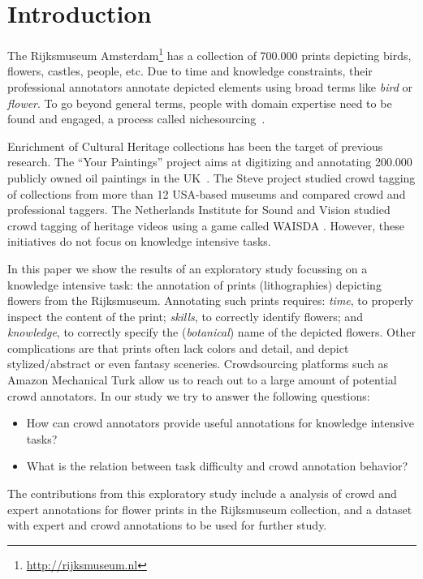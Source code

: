 \documentclass{sig-alternate-2013}
\begin{document}
\section{Introduction}
The Rijksmuseum Amsterdam\footnote{\url{http://rijksmuseum.nl}} has a collection of 700.000 prints depicting birds, flowers, castles, people, etc. Due to time and knowledge constraints, their professional annotators annotate depicted elements using broad terms like \textit{bird} or \textit{flower}. To go beyond general terms, people with domain expertise need to be found and engaged, a process called nichesourcing~\cite{Boer2012}.

Enrichment of Cultural Heritage collections has been the target of previous research. The ``Your Paintings'' project aims at digitizing and annotating 200.000 publicly owned oil paintings in the UK~\cite{Ellis2012}. The Steve project \cite{Trant2006} studied crowd tagging of collections from more than 12 USA-based museums and compared crowd and professional taggers. The Netherlands Institute for Sound and Vision studied crowd tagging of heritage videos using a game called WAISDA \cite{Gligorov2010}. However, these initiatives do not focus on knowledge intensive tasks.

In this paper we show the results of an exploratory study focussing on a knowledge intensive task: the annotation of prints (lithographies) depicting flowers from the Rijksmuseum. Annotating such prints requires: \textit{time}, to properly inspect the content of the print; \textit{skills}, to correctly identify flowers; and \textit{knowledge}, to correctly specify the (\textit{botanical}) name of the depicted flowers. Other complications are that prints often lack colors and detail, and depict stylized/abstract or even fantasy sceneries. Crowdsourcing platforms such as Amazon Mechanical Turk allow us to reach out to a large amount of potential crowd annotators. In our study we try to answer the following questions:

\begin{itemize}
	\item How can crowd annotators provide useful annotations for knowledge intensive tasks?
	\item What is the relation between task difficulty and crowd annotation behavior?
\end{itemize}

The contributions from this exploratory study include a analysis of crowd and expert annotations for flower prints in the Rijksmuseum collection, and a dataset with expert and crowd annotations to be used for further study. 
\end{document}
